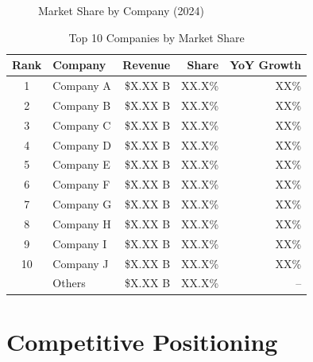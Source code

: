 \documentclass[11pt,letterpaper]{report}
\begin{document}

\begin{figure}[htbp]
\centering
\caption{Market Share by Company (2024)}
\label{fig:market_share}
\end{figure}

\begin{table}[htbp]
\centering
\caption{Top 10 Companies by Market Share}
\begin{tabular}{@{}clrrr@{}}
\toprule
\textbf{Rank} & \textbf{Company} & \textbf{Revenue} & \textbf{Share} & \textbf{YoY Growth} \\
\midrule
1 & Company A & \$X.XX B & XX.X\% & \trendup{} XX\% \\
\rowcolor{tablealt} 2 & Company B & \$X.XX B & XX.X\% & \trendup{} XX\% \\
3 & Company C & \$X.XX B & XX.X\% & \trendflat{} XX\% \\
\rowcolor{tablealt} 4 & Company D & \$X.XX B & XX.X\% & \trendup{} XX\% \\
5 & Company E & \$X.XX B & XX.X\% & \trenddown{} XX\% \\
\rowcolor{tablealt} 6 & Company F & \$X.XX B & XX.X\% & \trendup{} XX\% \\
7 & Company G & \$X.XX B & XX.X\% & \trendup{} XX\% \\
\rowcolor{tablealt} 8 & Company H & \$X.XX B & XX.X\% & \trendflat{} XX\% \\
9 & Company I & \$X.XX B & XX.X\% & \trendup{} XX\% \\
\rowcolor{tablealt} 10 & Company J & \$X.XX B & XX.X\% & \trenddown{} XX\% \\
\midrule
& Others & \$X.XX B & XX.X\% & -- \\
\bottomrule
\end{tabular}
\label{tab:market_share}
\end{table}

\section{Competitive Positioning}

\end{document}
